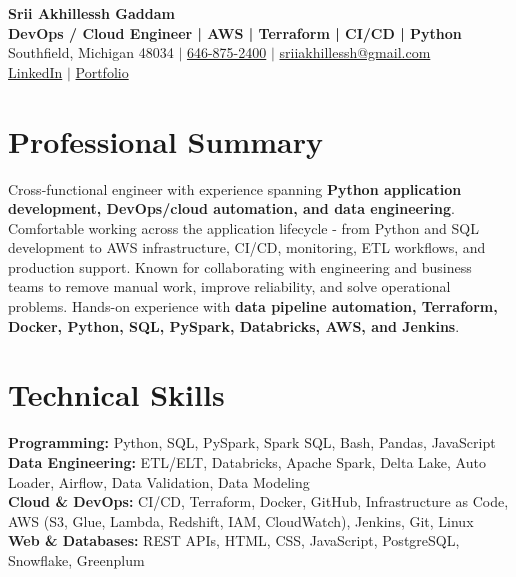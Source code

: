 \documentclass[letterpaper,10pt]{article}
\begin{document}
\fontsize{9.35pt}{10.45pt}\selectfont

\begin{center}
    {\LARGE \textbf{Srii Akhillessh Gaddam}} \\[-1pt]
    \textbf{DevOps / Cloud Engineer | AWS | Terraform | CI/CD | Python} \\[2pt]
    Southfield, Michigan 48034 $|$
    \href{tel:6468752400}{646-875-2400} $|$
    \href{mailto:sriiakhillessh@gmail.com}{sriiakhillessh@gmail.com} \\[1pt]
    \href{https://www.linkedin.com/in/srii-akhiilessh-gaddam-b48668191/}{LinkedIn} $|$
    \href{https://sriiakhillesshg.github.io/portfolio/}{Portfolio}
\end{center}
\vspace{-8pt}

\section{Professional Summary}
\small{Cross-functional engineer with experience spanning \textbf{Python application development, DevOps/cloud automation, and data engineering}. Comfortable working across the application lifecycle - from Python and SQL development to AWS infrastructure, CI/CD, monitoring, ETL workflows, and production support. Known for collaborating with engineering and business teams to remove manual work, improve reliability, and solve operational problems. Hands-on experience with \textbf{data pipeline automation, Terraform, Docker, Python, SQL, PySpark, Databricks, AWS, and Jenkins}.}

\section{Technical Skills}
\small{
\textbf{Programming:} Python, SQL, PySpark, Spark SQL, Bash, Pandas, JavaScript \\
\textbf{Data Engineering:} ETL/ELT, Databricks, Apache Spark, Delta Lake, Auto Loader, Airflow, Data Validation, Data Modeling \\
\textbf{Cloud \& DevOps:} CI/CD, Terraform, Docker, GitHub, Infrastructure as Code, AWS (S3, Glue, Lambda, Redshift, IAM, CloudWatch), Jenkins, Git, Linux \\
\textbf{Web \& Databases:} REST APIs, HTML, CSS, JavaScript, PostgreSQL, Snowflake, Greenplum
}
\end{document}
